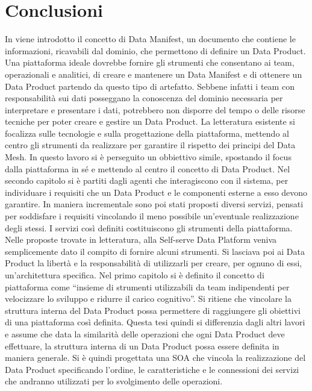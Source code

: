 \documentclass[12pt]{report}
\begin{document}
\chapter*{Conclusioni}
In \cite{dehghani_data_2022} viene introdotto il concetto di Data Manifest, un documento che contiene le informazioni, ricavabili dal dominio, che permettono di definire un Data Product.
Una piattaforma ideale dovrebbe fornire gli strumenti che consentano ai team, operazionali e analitici, di creare e mantenere un Data Manifest e di ottenere un Data Product partendo da questo tipo di artefatto.
Sebbene infatti i team con responsabilità sui dati posseggano la conoscenza del dominio necessaria per interpretare e presentare i dati, potrebbero non disporre del tempo o delle risorse tecniche per poter creare e gestire un Data Product. 
La letteratura esistente si focalizza sulle tecnologie e sulla progettazione della piattaforma, mettendo al centro gli strumenti da realizzare per garantire il rispetto dei principi del Data Mesh.
In questo lavoro si è perseguito un obbiettivo simile, spostando il focus dalla piattaforma in sé e mettendo al centro il concetto di Data Product.
Nel secondo capitolo si è partiti dagli agenti che interagiscono con il sistema, per individuare i requisiti che un Data Product e le componenti esterne a esso devono garantire.
In maniera incrementale sono poi stati proposti diversi servizi, pensati per soddisfare i requisiti vincolando il meno possibile un'eventuale realizzazione degli stessi.
I servizi così definiti costituiscono gli strumenti della piattaforma.
Nelle proposte trovate in letteratura, alla Self-serve Data Platform veniva semplicemente dato il compito di fornire alcuni strumenti.
Si lasciava poi ai Data Product la libertà e la responsabilità di utilizzarli per creare, per ognuno di essi, un'architettura specifica. 
Nel primo capitolo si è definito il concetto di piattaforma come ``insieme di strumenti utilizzabili da team indipendenti per velocizzare lo sviluppo e ridurre il carico cognitivo''.
Si ritiene che vincolare la struttura interna del Data Product possa permettere di raggiungere gli obiettivi di una piattaforma così definita.
Questa tesi quindi si differenzia dagli altri lavori e assume che data la similarità delle operazioni che ogni Data Product deve effettuare, la struttura interna di un Data Product possa essere definita in maniera generale.
Si è quindi progettata una SOA che vincola la realizzazione del Data Product specificando l'ordine, le caratteristiche e le connessioni dei servizi che andranno utilizzati per lo svolgimento delle operazioni.
\end{document}
